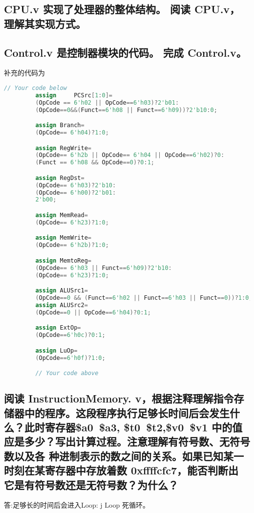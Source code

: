 \documentclass{ctexart}
\begin{document}
         \subsection{ CPU.v 实现了处理器的整体结构。 阅读 CPU.v，理解其实现方式。}
         \subsection{Control.v 是控制器模块的代码。 完成 Control.v。}

         补充的代码为
         \begin{lstlisting}[language=verilog]
         // Your code below
         assign 	PCSrc[1:0]=
         (OpCode == 6'h02 || OpCode==6'h03)?2'b01:
         (OpCode==0&&(Funct==6'h08 || Funct==6'h09))?2'b10:0;

         assign Branch=
         (OpCode== 6'h04)?1:0;

         assign RegWrite=
         (OpCode== 6'h2b || OpCode== 6'h04 || OpCode==6'h02)?0:
         (Funct == 6'h08 && OpCode==0)?0:1;

         assign RegDst=
         (OpCode== 6'h03)?2'b10:
         (OpCode== 6'h00)?2'b01:
         2'b00;

         assign MemRead=
         (OpCode== 6'h23)?1:0;

         assign MemWrite=
         (OpCode== 6'h2b)?1:0;

         assign MemtoReg=
         (OpCode== 6'h03 || Funct==6'h09)?2'b10:
         (OpCode== 6'h23)?1:0;

         assign ALUSrc1=
         (OpCode==0 && (Funct==6'h02 || Funct==6'h03 || Funct==0))?1:0;
         assign ALUSrc2=
         (OpCode==0 || OpCode==6'h04)?0:1;

         assign ExtOp=
         (OpCode==6'h0c)?0:1;

         assign LuOp=
         (OpCode==6'h0f)?1:0;

         // Your code above
         \end{lstlisting}
         \subsection{ 阅读 InstructionMemory.   
             v，根据注释理解指令存储器中的程序。这段程序执行足够长时间后会发生什么？此时寄存器\$a0~\$a3,
             \$t0~\$t2,\$v0~\$v1 中的值应是多少？写出计算过程。注意理解有符号数、无符号数以及各
             种进制表示的数之间的关系。如果已知某一时刻在某寄存器中存放着数 0xffffcfc7，能否判断出
         它是有符号数还是无符号数？为什么？}
         答:足够长的时间后会进入Loop: j Loop 死循环。
\end{document}
